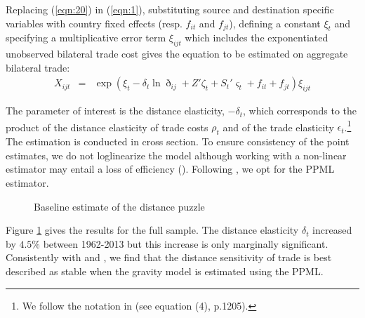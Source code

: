 \documentclass[12pt,twoside,a4paper,notitlepage]{article}
\begin{document}
Replacing (\ref{eqn:20}) in (\ref{eqn:1}), substituting source and destination specific variables with country fixed effects (resp. $f_{it}$ and $f_{jt}$), defining a constant $\xi_t$ and specifying a multiplicative error term $\xi_{ijt}$ which includes the exponentiated unobserved bilateral trade cost gives the equation to be estimated on aggregate bilateral trade: 
\begin{eqnarray}
X_{ijt}&=&\exp{\left(\xi_t-\delta_{t}\ln{\eth_{ij}}+{Z}'\zeta_t+{S_t}'\varsigma_t+f_{it}+f_{jt}\right)\xi_{ijt}} \label{eqn:4}
\end{eqnarray}

The parameter of interest is the distance elasticity, $-\delta_t$, which corresponds to the product of the distance elasticity of trade costs $\rho_t$ and of the trade elasticity $\epsilon_t$.\footnote{We follow the notation in \cite{Head2013} (see equation (4), p.1205).} 
The estimation is conducted in cross section. 
To ensure consistency of the point estimates, we do not loglinearize the model although working with a non-linear estimator may entail a loss of efficiency (\cite{Manning1999}).
Following \cite{SantosSilva2006}, we opt for the PPML estimator.

\begin{figure}[h!]
	\caption{Baseline estimate of the distance puzzle \label{fig:DP_baseline}}
	\begin{center}
		\setlength{\fboxrule}{1pt} %
		\setlength{\fboxsep}{.1in} %
	\end{center}
\end{figure}

Figure \ref{fig:DP_baseline} gives the results for the full sample.
The distance elasticity $\delta_t$ increased by $4.5$\% between 1962-2013 but this increase is only marginally significant.
Consistently with \cite{Head2013} and \cite{Bosquet2015}, we find that the distance sensitivity of trade is best described as stable when the gravity model is estimated using the PPML.
\end{document}
